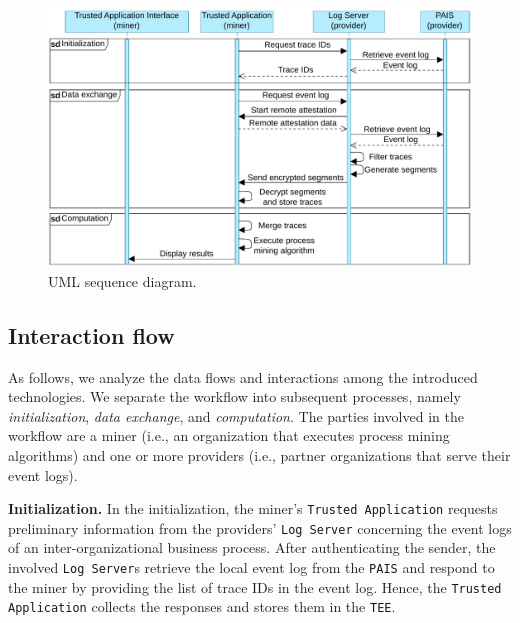 \begin{figure}[t]
\centering
\includegraphics[width=10.5 cm]{content/figures/sequence_diagram.pdf}
\caption{UML sequence diagram.}
\label{fig:sequence_diagram}
\end{figure}
\subsection{Interaction flow}
As follows, we analyze the data flows and interactions among the introduced technologies. We separate the workflow into subsequent processes, namely \textit{initialization}, \textit{data exchange}, and \textit{computation}.
The parties involved in the workflow are a miner (i.e., an organization that executes process mining algorithms) and one or more providers (i.e., partner organizations that serve their event logs). %

\textbf{Initialization.} In the initialization, the miner's \texttt{Trusted Application} requests preliminary information from the providers' \texttt{Log Server} concerning the event logs of an inter-organizational business process. After authenticating the sender, the involved \texttt{Log Server}s retrieve the local event log from the \texttt{PAIS} and respond to the miner by providing the list of trace IDs in the event log. Hence, the \texttt{Trusted Application} collects the responses and stores them in the \texttt{TEE}.

